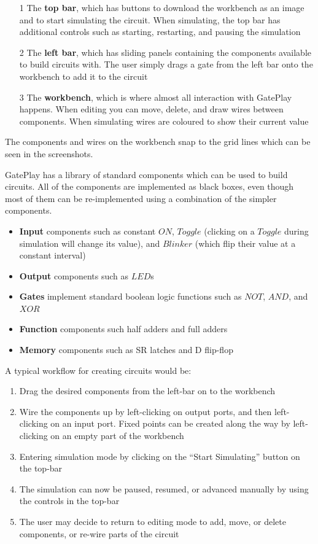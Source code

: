 \begin{itemize}
	\item[1] The \textbf{top bar}, which has buttons to download the workbench as an image and to start simulating the circuit. When simulating, the top bar has additional controls such as starting, restarting, and pausing the simulation
	\item[2] The \textbf{left bar}, which has sliding panels containing the  components available to build circuits with. The user simply drags a gate from the left bar onto the workbench to add it to the circuit
	\item[3] The \textbf{workbench}, which is where almost all interaction with GatePlay happens. When editing you can move, delete, and draw wires between components. When simulating wires are coloured to show their current value
\end{itemize}

The components and wires on the workbench snap to the grid lines which can be seen in the screenshots.

GatePlay has a library of standard components which can be used to build circuits. All of the components are implemented as black boxes, even though most of them can be re-implemented using a combination of the simpler components.

\begin{itemize}
	\item \textbf{Input} components such as constant $ON$, $Toggle$ (clicking on a $Toggle$ during simulation will change its value), and $Blinker$ (which flip their value at a constant interval)
	\item \textbf{Output} components such as $LED$s
	\item \textbf{Gates} implement standard boolean logic functions such as $NOT$, $AND$, and $XOR$
	\item \textbf{Function} components such half adders and full adders
	\item \textbf{Memory} components such as SR latches and D flip-flop  
\end{itemize}

A typical workflow for creating circuits would be:

\begin{enumerate}
	\item Drag the desired components from the left-bar on to the workbench
	\item Wire the components up by left-clicking on output ports, and then left-clicking on an input port. Fixed points can be created along the way by left-clicking on an empty part of the workbench
	\item Entering simulation mode by clicking on the ``Start Simulating'' button on the top-bar
	\item The simulation can now be paused, resumed, or advanced manually by using the controls in the top-bar
	\item The user may decide to return to editing mode to add, move, or delete components, or re-wire parts of the circuit
\end{enumerate}

